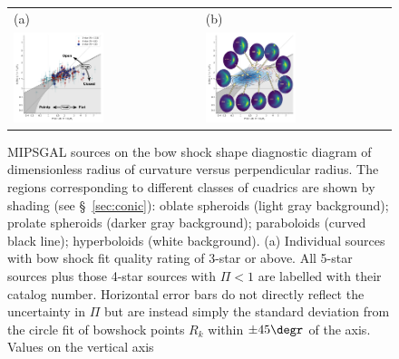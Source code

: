 \begin{figure}
  \centering
  \setlength\tabcolsep{0pt}
  \begin{tabular}{ll}
    (a) & (b) \\
    \includegraphics[width=0.5\textwidth]
    {figs/mipsgal-Rc-R90-zoom-annotated}
        & \includegraphics[width=0.5\textwidth]
          {figs/mipsgal-Rc-R90-thumbnails} 
  \end{tabular}
  \caption[]{MIPSGAL sources on the bow shock shape diagnostic diagram
    of dimensionless radius of curvature versus perpendicular radius.
    The regions corresponding to different classes of cuadrics are
    shown by shading (see \S~\ref{sec:conic}): oblate spheroids (light
    gray background); prolate spheroids (darker gray background);
    paraboloids (curved black line); hyperboloids (white background).
    (a) Individual sources with bow shock fit quality rating of 3-star
    or above.  All 5-star sources plus those 4-star sources with
    \(\Pi < 1\) are labelled with their \cite{Kobulnicky:2016a} catalog
    number.  Horizontal error bars do not directly reflect the
    uncertainty in \(\Pi\) but are instead simply the standard deviation
    from the circle fit of bowshock points \(R_k\) within
    \(\pm 45\degr\) of the axis.  Values on the vertical axis
}
\end{figure}

